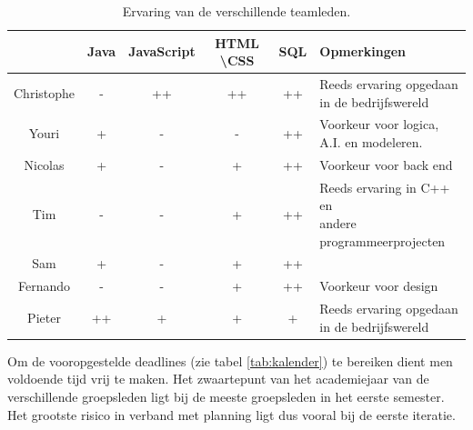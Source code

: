 \begin{table} [htbp]
	\centering
  	\caption{Ervaring van de verschillende teamleden.}
    \begin{tabular}{c|ccccl}
  		  	& Java 	& JavaScript & HTML \textbackslash CSS 		& SQL 	& Opmerkingen \\
  		  	\hline
  		  	Christophe & -	& ++ 		& ++ 		& ++ & \shortstack{ Reeds ervaring opgedaan \\ in de bedrijfswereld} \\
  		  	Youri & + & - & - & ++ & \shortstack{Voorkeur voor logica, \\ A.I. en modeleren.} \\
  		  	Nicolas & + & - & + & ++ & Voorkeur voor back end \\
  		  	Tim & - & - & + & ++ & \shortstack{Reeds ervaring in C++ en \\ andere programmeerprojecten} \\
  		  	Sam & + & - & + & ++ & \\
  		  	Fernando & - & - & + & ++ & Voorkeur voor design \\
  		  	Pieter & ++ & + & + & + & \shortstack{Reeds ervaring opgedaan \\ in de bedrijfswereld}
    \end{tabular}
  	\label{tab:skilllevel}
\end{table}
Om de vooropgestelde deadlines (zie tabel \ref{tab:kalender}) te bereiken dient men voldoende tijd vrij te maken. Het zwaartepunt van het academiejaar van de verschillende groepsleden ligt bij de meeste groepsleden in het eerste semester. Het grootste risico in verband met planning ligt dus vooral bij de eerste iteratie.
